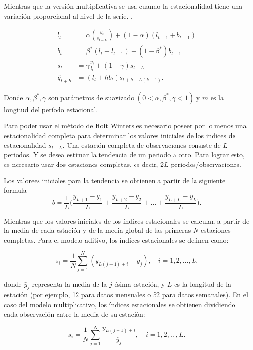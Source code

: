 \documentclass[12pt,letterpaper]{article}
\begin{document}
Mientras que la versión multiplicativa se usa cuando la estacionalidad tiene una variación proporcional al nivel de la serie. \cite{hyndman2018forecasting}. 

\begin{align}
    l_t &= \alpha( \frac{y_t}{s_{t-L}}) + (1-\alpha)(l_{t-1}+b_{t-1})\\
    b_t &= \beta^*(l_t - l_{t-1}) + (1-\beta^*)b_{t-1}\\
    s_t &= \gamma \frac{y_t}{l_t}+(1-\gamma)s_{t-L}\\
    \hat{y}_{t+h} &= (l_t + hb_t )s_{t+h-L(k+1)}.
\end{align}

Donde $\alpha, \beta^*, \gamma$ son parámetros de suavizado $(0<\alpha, \beta^*, \gamma<1)$ y $m$ es la longitud del período  estacional.

Para poder usar el método de Holt Winters es necesario poseer por lo menos una estacionalidad completa para determinar los valores iniciales de los indices de estacionalidad $s_{t-L}$. Una estación completa de observaciones consiste de $L$ periodos. Y se desea estimar la tendencia de un periodo a otro. Para lograr esto, es necesario usar dos estaciones completas, es decir, $2L$ periodos/observaciones.

Los valorees iniciales para la tendencia se obtienen a partir de la siguiente formula 
\begin{equation}
b=\frac{1}{L} \bigg( \frac{y_{L+1}-y_1}{L} + \frac{y_{L+2}-y_2}{L} + \dots + \frac{y_{L+L}-y_L}{L} \bigg).
\end{equation}

Mientras que los valores iniciales de los índices estacionales se calculan a partir de la media de cada estación y de la media global de las primeras $N$ estaciones completas. Para el modelo aditivo, los índices estacionales se definen como:

\begin{equation}
s_i = \frac{1}{N} \sum_{j=1}^{N} (y_{L(j-1)+i} - \bar{y}_j), \quad i = 1,2,\dots,L.
\end{equation}

donde $\bar{y}_j$ representa la media de la $j$-ésima estación, y $L$ es la longitud de la estación (por ejemplo, 12 para datos mensuales o 52 para datos semanales).
En el caso del modelo multiplicativo, los índices estacionales se obtienen dividiendo cada observación entre la media de su estación:

\begin{equation}
s_i = \frac{1}{N} \sum_{j=1}^{N} \frac{y_{L(j-1)+i}}{\bar{y}_j}, \quad i = 1,2,\dots,L.
\end{equation}
\end{document}
